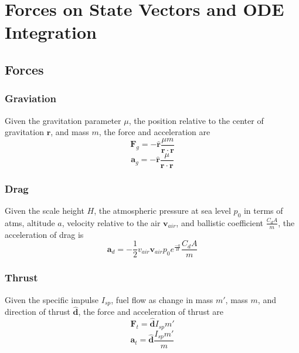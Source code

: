 \section{Forces on State Vectors and ODE Integration}

\subsection{Forces}
\subsubsection{Graviation}
Given the gravitation parameter $\mu$, the position relative to the center of gravitation $\mathbf{r}$,
and mass $m$, the force and acceleration are
\begin{equation}
    \label{force_gravity}
    \mathbf{F}_g=-\hat{\mathbf{r}}\frac{\mu{}m}{\mathbf{r}\cdot\mathbf{r}}
\end{equation}
\begin{equation}
    \label{accel_gravity}
    \mathbf{a}_g=-\hat{\mathbf{r}}\frac{\mu}{\mathbf{r}\cdot\mathbf{r}}
\end{equation}

\subsubsection{Drag}
Given the scale height $H$, the atmospheric pressure at sea level $p_0$ in terms of atms, altitude $a$, velocity relative
to the air $\mathbf{v}_{air}$, and ballistic coefficient $\frac{C_dA}{m}$, the acceleration of drag is
\begin{equation}
    \label{accel_drag}
    \mathbf{a}_d=-\frac{1}{2}v_{air}\mathbf{v}_{air}p_0e^{\frac{-a}{H}}\frac{C_dA}{m}
\end{equation}

\subsubsection{Thrust}
Given the specific impulse $I_{sp}$, fuel flow as change in mass $m'$, mass $m$, and direction of thrust $\hat{\mathbf{d}}$,
the force and acceleration of thrust are
\begin{equation}
    \label{force_thrust}
    \mathbf{F}_t=\hat{\mathbf{d}}I_{sp}m'
\end{equation}
\begin{equation}
    \label{accel_thrust}
    \mathbf{a}_t=\hat{\mathbf{d}}\frac{I_{sp}m'}{m}
\end{equation}

